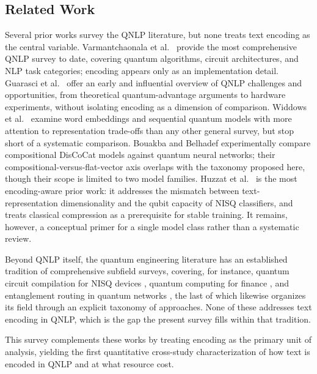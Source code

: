 \documentclass{ieeeaccess}
\begin{document}
\subsection{Related Work}
\label{subsec:related_work}
Several prior works survey the QNLP literature, but none treats text encoding as the central variable. Varmantchaonala et al.\ \cite{varmantchaonala_quantum_2024} provide the most comprehensive QNLP survey to date, covering quantum algorithms, circuit architectures, and NLP task categories; encoding appears only as an implementation detail. Guarasci et al.\ \cite{guarasci_quantum_2022} offer an early and influential overview of QNLP challenges and opportunities, from theoretical quantum-advantage arguments to hardware experiments, without isolating encoding as a dimension of comparison. Widdows et al.\ \cite{widdows_quantum_2024} examine word embeddings and sequential quantum models with more attention to representation trade-offs than any other general survey, but stop short of a systematic comparison. Bouakba and Belhadef \cite{bouakba_comparative_2025} experimentally compare compositional DisCoCat models against quantum neural networks; their compositional-versus-flat-vector axis overlaps with the taxonomy proposed here, though their scope is limited to two model families. Huzzat et al.\ \cite{huzzat_primer_2026} is the most encoding-aware prior work: it addresses the mismatch between text-representation dimensionality and the qubit capacity of NISQ classifiers, and treats classical compression as a prerequisite for stable training. It remains, however, a conceptual primer for a single model class rather than a systematic review.

Beyond QNLP itself, the quantum engineering literature has an established tradition of comprehensive subfield surveys, covering, for instance, quantum circuit compilation for NISQ devices \cite{kusyk2021survey}, quantum computing for finance \cite{egger2020quantum}, and entanglement routing in quantum networks \cite{abane2025entanglement}, the last of which likewise organizes its field through an explicit taxonomy of approaches. None of these addresses text encoding in QNLP, which is the gap the present survey fills within that tradition.

This survey complements these works by treating encoding as the primary unit of analysis, yielding the first quantitative cross-study characterization of how text is encoded in QNLP and at what resource cost.
\end{document}
